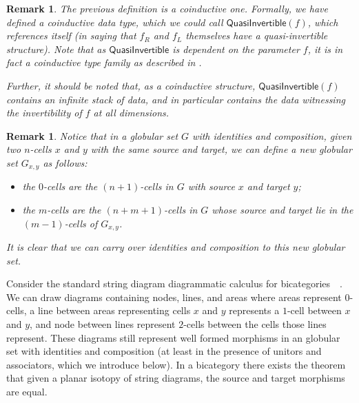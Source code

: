 \documentclass[draft]{article}
\newtheorem{remark}[theorem]{Remark} \newtheorem*{claim}{Claim}
\begin{document}
\begin{remark}
  The previous definition is a coinductive one. Formally, we have
  defined a coinductive data type, which we could call
  \(\mathsf{QuasiInvertible}(f)\), which references itself (in saying
  that \(f_R\) and \(f_L\) themselves have a quasi-invertible
  structure). Note that as \(\mathsf{QuasiInvertible}\) is dependent
  on the parameter \(f\), it is in fact a coinductive type family as
  described in .

  Further, it should be noted that, as a coinductive structure,
  \(\mathsf{QuasiInvertible}(f)\) contains an infinite stack of data,
  and in particular contains the data witnessing the invertibility of
  \(f\) at all dimensions.
\end{remark}

\begin{remark}\label{descendants}
  Notice that in a globular set \(G\) with identities and composition,
  given two \(n\)-cells \(x\) and \(y\) with the same source and
  target, we can define a new globular set \(G_{x,y}\) as follows:
  \begin{itemize}
  \item the \(0\)-cells are the \((n+1)\)-cells in \(G\) with source
    \(x\) and target \(y\);
  \item the \(m\)-cells are the \((n+m+1)\)-cells in \(G\) whose
    source and target lie in the \((m-1)\)-cells of \(G_{x,y}\).
  \end{itemize}
  It is clear that we can carry over identities and composition to
  this new globular set.
\end{remark}

Consider the standard string diagram diagrammatic calculus for
bicategories~\cite{selinger2010survey}~\cite{heunen2019categories}. We
can draw diagrams containing nodes, lines, and areas where areas
represent \(0\)-cells, a line between areas representing cells \(x\)
and \(y\) represents a \(1\)-cell between \(x\) and \(y\), and node
between lines represent \(2\)-cells between the cells those lines
represent. These diagrams still represent well formed morphisms in an
globular set with identities and composition (at least in the presence
of unitors and associators, which we introduce below). In a bicategory
there exists the theorem that given a planar isotopy of string
diagrams, the source and target morphisms are equal.
\end{document}
